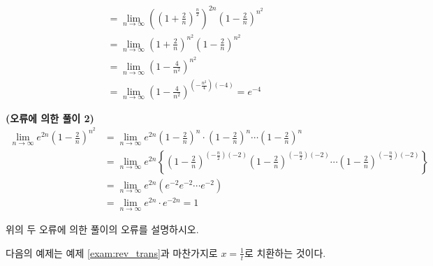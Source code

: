 \documentclass[11pt, a4paper]{book}
\begin{document}
\begin{example}
\begin{solution}
\begin{align*}
 		& =\displaystyle\lim_{n\to\infty}\left(\left(1+\frac{2}{n}\right)^{\frac{n}{2}}\right)^{2n}\left(1-\frac{2}{n}\right)^{n^{2}}\\
 		& =\displaystyle\lim_{n\to\infty}\left(1+\frac{2}{n}\right)^{n^{2}}\left(1-\frac{2}{n}\right)^{n^{2}}\\
 		& =\displaystyle\lim_{n\to\infty}\left(1-\frac{4}{n^{2}}\right)^{n^{2}}\\
 		& =\displaystyle\lim_{n\to\infty}\left(1-\frac{4}{n^{2}}\right)^{\left(-\frac{n^{2}}{4}\right)(-4)}=e^{-4}
 	\end{align*}
 \end{solution}
\begin{solution}\textbf{(오류에 의한 풀이 2)}
	\begin{align*}
		\displaystyle\lim_{n\to\infty}e^{2n}\left(1-\frac{2}{n}\right)^{n^{2}}
		& =\displaystyle\lim_{n\to\infty}e^{2n}\left(1-\frac{2}{n}\right)^{n}\cdot\left(1-\frac{2}{n}\right)^{n}\cdots\left(1-\frac{2}{n}\right)^{n}\\
		& =\displaystyle\lim_{n\to\infty}e^{2n}\left\{\left(1-\frac{2}{n}\right)^{\left(-\frac{n}{2}\right)(-2)}\left(1-\frac{2}{n}\right)^{\left(-\frac{n}{2}\right)(-2)}\cdots\left(1-\frac{2}{n}\right)^{\left(-\frac{n}{2}\right)(-2)}\right\}\\
		& =\displaystyle\lim_{n\to\infty}e^{2n}\left(e^{-2}e^{-2}\cdots e^{-2}\right)\\
		& =\displaystyle\lim_{n\to\infty}e^{2n}\cdot e^{-2n}=1
	\end{align*}
\end{solution}
\end{example} 
	\begin{problem}
위의 두 오류에 의한 풀이의 오류를 설명하시오.		
	\end{problem}
\vspace{1em}
다음의 예제는 예제 \ref{exam:rev_trans}과 마찬가지로 $x =\frac{1}{t}$로 치환하는 것이다.  
\end{document}
